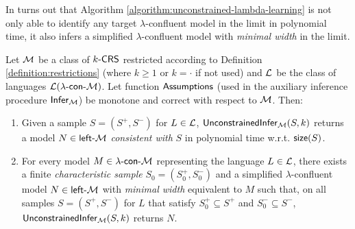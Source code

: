 In turns out that Algorithm \ref{algorithm:unconstrained-lambda-learning} is not only able to identify any target $\lambda$-confluent model in the limit in polynomial time, it also infers a simplified $\lambda$-confluent model with \emph{minimal width} in the limit.

\begin{theorem}\label{theorem:unconstrained-lambda-inference}
Let $\textup{\sf $\mathcal{M}$}$ be a class of $\textup{\sf $k$-\textup{\sf CRS\/}}$ restricted according to Definition \ref{definition:restrictions} (where $k \ge 1$ or $k = \cdot$ if not used) and $\textup{\sf $\mathcal{L}$}$ be the class of languages ${\cal L}(\textup{\sf $\lambda$-con-\textup{\sf $\mathcal{M}$}})$. Let function $\textup{\sf Assumptions}$ (used in the auxiliary inference procedure $\textup{\sf Infer}_{\textup{\sf $\mathcal{M}$}}$) be monotone and correct with respect to $\textup{\sf $\mathcal{M}$}$. Then:
\begin{enumerate}
\item\label{unconstrained-lambda-inference1} Given a sample $S = (S^+, S^-)$ for $L \in \textup{\sf $\mathcal{L}$}$, $\textup{\sf UnconstrainedInfer}_{\textup{\sf $\mathcal{M}$}}(S, k)$ returns a model $N \in \textup{\sf left-\textup{\sf $\mathcal{M}$}}$ \emph{consistent with} $S$ in polynomial time w.r.t. $\textup{\sf size}(S)$.

\item\label{unconstrained-lambda-inference2} For every model $M \in \textup{\sf $\lambda$-con-\textup{\sf $\mathcal{M}$}}$ representing the language $L \in \textup{\sf $\mathcal{L}$}$, there exists a finite \emph{characteristic sample} $S_0 = (S_0^+, S_0^-)$ and a simplified $\lambda$-confluent model $N \in \textup{\sf left-\textup{\sf $\mathcal{M}$}}$ with \emph{minimal width} equivalent to $M$ such that, on all samples $S = (S^+, S^-)$ for $L$ that satisfy $S_0^+ \subseteq S^+$ and $S_0^- \subseteq S^-$, $\textup{\sf UnconstrainedInfer}_{\textup{\sf $\mathcal{M}$}}(S, k)$ returns $N$.
\end{enumerate}
\end{theorem}

